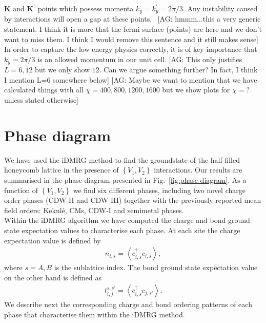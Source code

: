 \documentclass[aps,prx,10pt,twocolumn,floatfix,superscriptaddress,showpacs,numerical,footinbib]{revtex4-1}
\newcommand{\noteAG}[1]{{\color{blue} [AG: #1]}}
\begin{document}
$\mathbf{K}$ and $\mathbf{K}^{\prime}$ points which possess momenta $k_y=k_y^{\prime} = 2\pi / 3$.
%
Any instability caused by interactions will open a gap at these points.~\noteAG{hmmm...this a very generic statement. I think it is more that the fermi surface (points)
are here and we don't want to miss them. I think I would remove this sentence and it still makes sense}
%
In order to capture the low energy physics correctly, it is of key importance that $k_y= 2 \pi / 3$ is an allowed momentum in our unit cell.
\noteAG{This only justifies $L=6,12$ but we only show $12$. Can we argue something further? In fact, I think I mention L=6 somewhere below}
\noteAG{Maybe we want to mention that we have calculated things with all  $\chi=400,800,1200,1600$ but we show plots for $\chi=?$ unless stated otherwise}
%


\section{\label{sec:phasediagram}Phase diagram}
%
We have used the iDMRG method to find the groundstate of the half-filled honeycomb lattice in the presence of 
$\left\lbrace V_{1},V_{2}\right\rbrace$ interactions.
%
Our results are summarised in the phase diagram presented in Fig.~\ref{fig:phase diagram}.
%
As a function of $\left\lbrace V_{1},V_{2}\right\rbrace$ we find six different phases, 
including two novel charge order phases (CDW-II and CDW-III) together with the previously 
reported mean field orders: Kekul\'{e}, CMs, CDW-I and semimetal phases.\\
%
%
Within the iDMRG algorithm we have computed the charge and bond ground state expectation values
to characterise each phase.
%
At each site the charge expectation value is defined by 
%
\begin{eqnarray}
\label{eq:charge}
n_{i,s}=\left\langle c^{\dagger}_{i,s}c_{i,s}\right\rangle,  
\end{eqnarray}
%
where $s=A,B$ is the sublattice index. 
%
The bond ground state expectation value on the other hand is defined as
%
\begin{eqnarray}
\label{eq:bond}
t^{s,s'}_{i,j}=\left\langle c^{\dagger}_{i,s}c_{j,s'}\right\rangle.
\end{eqnarray}
%
%
We describe next the corresponding charge and bond ordering patterns of each phase 
that characterise them within the iDMRG method.
\end{document}

